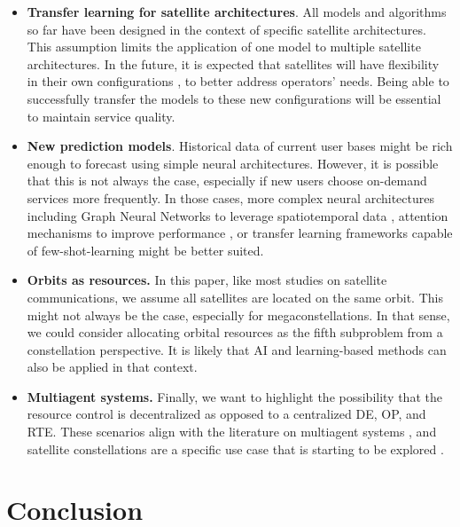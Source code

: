 \documentclass[letterpaper]{article} %
\begin{document}
\begin{itemize}
    \item \textbf{Transfer learning for satellite architectures}. All models and algorithms so far have been designed in the context of specific satellite architectures. This assumption limits the application of one model to multiple satellite architectures. In the future, it is expected that satellites will have flexibility in their own configurations \cite{DeWeck2004OptimalAlgorithm}, to better address operators' needs. Being able to successfully transfer the models to these new configurations will be essential to maintain service quality.

    \item \textbf{New prediction models}. Historical data of current user bases might be rich enough to forecast using simple neural architectures. However, it is possible that this is not always the case, especially if new users choose on-demand services more frequently. In those cases, more complex neural architectures including Graph Neural Networks to leverage spatiotemporal data \cite{wang2020traffic}, attention mechanisms to improve performance \cite{Vaswani2017}, or transfer learning frameworks capable of few-shot-learning \cite{Panigrahi2021} might be better suited.

    \item \textbf{Orbits as resources.} In this paper, like most studies on satellite communications, we assume all satellites are located on the same orbit. This might not always be the case, especially for megaconstellations. In that sense, we could consider allocating orbital resources as the fifth subproblem from a constellation perspective. It is likely that AI and learning-based methods can also be applied in that context.

    \item \textbf{Multiagent systems.} Finally, we want to highlight the possibility that the resource control is decentralized as opposed to a centralized DE, OP, and RTE. These scenarios align with the literature on multiagent systems \cite{foerster2018counterfactual, Rashid2018}, and satellite constellations are a specific use case that is starting to be explored \cite{he2020load, hu2020multi}.
\end{itemize}








\section{Conclusion}
\end{document}
